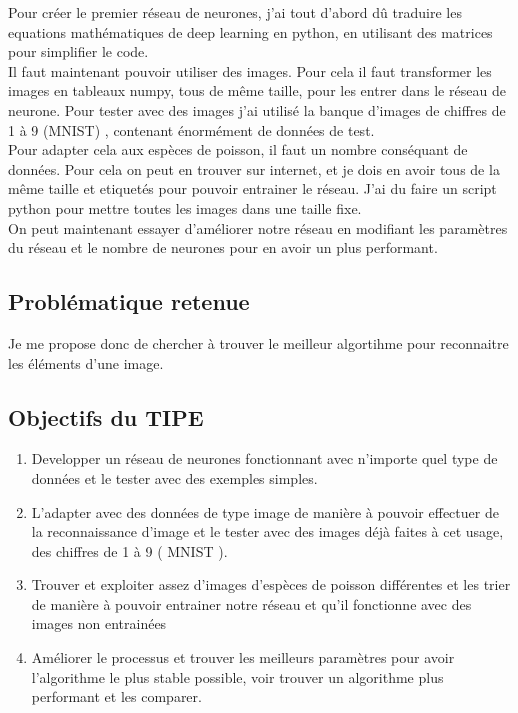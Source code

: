 \documentclass[a4paper,11pt]{report}
\begin{document}
Pour créer le premier réseau de neurones, j’ai tout d’abord dû traduire les equations mathématiques de deep learning en python, en utilisant des matrices pour simplifier le code. \cite{ref2} \\

Il faut maintenant pouvoir utiliser des images. Pour cela il faut transformer les images en tableaux numpy, tous de même taille, pour les entrer dans le réseau de neurone. Pour tester avec des images j’ai utilisé la banque d’images de chiffres de 1 à 9 (MNIST) , contenant énormément de données de test. \cite{ref3} \\

Pour adapter cela aux espèces de poisson, il faut un nombre conséquant de données. Pour cela on peut en trouver sur internet, et je dois en avoir tous de la même taille et etiquetés pour pouvoir entrainer le réseau. J’ai du faire un script python pour mettre toutes les images dans une taille fixe. \cite{ref4} \\

On peut maintenant essayer d’améliorer notre réseau en modifiant les paramètres du réseau et le nombre de neurones pour en avoir un plus performant. \cite{ref5} \\

\subsection*{Problématique retenue}

Je me propose donc de chercher à trouver le meilleur algortihme pour reconnaitre les éléments d'une image.

\subsection*{Objectifs du TIPE}

\begin{enumerate}

\item Developper un réseau de neurones fonctionnant avec n’importe quel type de données et le tester avec des exemples simples.
\item L’adapter avec des données de type image de manière à pouvoir effectuer de la reconnaissance d’image et le tester avec des images déjà faites à cet usage, des chiffres de 1 à 9 ( MNIST ).
\item Trouver et exploiter assez d’images d’espèces de poisson différentes et les trier de manière à pouvoir entrainer notre réseau et qu’il fonctionne avec des images non entrainées
\item Améliorer le processus et trouver les meilleurs paramètres pour avoir l’algorithme le plus stable possible, voir trouver un algorithme plus performant et les comparer.

\end{enumerate}

​ %
\end{document}

